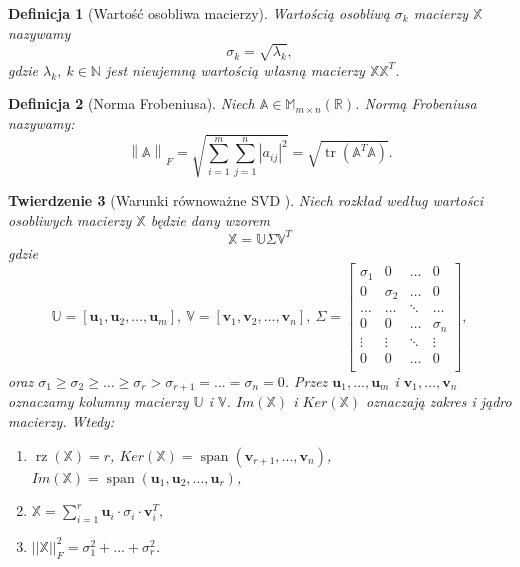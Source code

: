 \documentclass[12pt,a4paper]{report}
\newtheorem{df}{Definicja}[chapter]
\newtheorem{tw}[df]{Twierdzenie}
\newcommand{\setN}{\mathbb{N}}
\newcommand{\przestrzen}[1]{\operatorname{span}\left({#1} \right)}
\newcommand{\norm}[2][]{\left\| {#2} \right\|_{#1}}
\newcommand{\rz}[1]{\operatorname{rz}\left({#1} \right)}
\newcommand{\tr}[1]{\operatorname{tr}\left({#1} \right)}
\begin{document}
\begin{df}[Wartość osobliwa macierzy]
Wartością osobliwą $\sigma_k$ macierzy $\mathbb{X}$ nazywamy
$$
\sigma_k = \sqrt{\lambda_k},
$$
gdzie $\lambda_k, \: k \in \setN$ jest nieujemną wartością własną macierzy $\mathbb{X} \mathbb{X}^T$.
\end{df}

\begin{df}[Norma Frobeniusa{\citep{ulafiir}}] %
Niech $\mathbb{A}\in \mathbb{M}_{m\times n}(\mathbb{R})$. Normą Frobeniusa nazywamy:
$$
{\norm{\mathbb{A}}}_F = \sqrt{\sum_{i=1}^m \sum_{j=1}^n |a_{ij}|^2} = \sqrt{\tr{\mathbb{A}^T \mathbb{A}}}.
$$
\end{df}

\begin{tw}[Warunki równoważne SVD {\citep{ulafiir}}]%
Niech rozkład według wartości osobliwych macierzy $\mathbb{X}$ będzie dany wzorem
$$
\mathbb{X}=\mathbb{U} \Sigma \mathbb{V}^T
$$
gdzie 
$$\mathbb{U}=[\mathbf{u}_1,\mathbf{u}_2,...,\mathbf{u}_m], \: \mathbb{V} = [\mathbf{v}_1,\mathbf{v}_2,...,\mathbf{v}_n], \: \Sigma = \left[
        \begin{array}{cccc}
         \sigma_{1} & 0 & \ldots & 0 \\
         0 & \sigma_{2} & \ldots & 0 \\
         \ldots & \ldots& \ddots & \ldots \\
         0 & 0 & \ldots & \sigma_{n} \\
         \vdots & \vdots & \ddots & \vdots \\
         0 & 0 & \ldots & 0 \\
         \end{array}
      \right],$$
oraz 
$\sigma_{1}\geq \sigma_{2} \geq ... \geq \sigma_{r} > \sigma_{r+1} = ... = \sigma_{n} = 0$. Przez $\mathbf{u}_1, \ldots, \mathbf{u}_m$ i $\mathbf{v}_1, \ldots, \mathbf{v}_n$ oznaczamy kolumny macierzy $\mathbb{U}$ i $\mathbb{V}$.
$Im(\mathbb{X})$ i $Ker(\mathbb{X})$ oznaczają zakres i jądro macierzy.
Wtedy:
\begin{enumerate}
\item $\rz{\mathbb{X}} = r$, $Ker(\mathbb{X}) = \przestrzen{\mathbf{v}_{r+1},...,\mathbf{v}_n}$, 
$Im(\mathbb{X}) = \przestrzen{\mathbf{u}_1,\mathbf{u}_2,...,\mathbf{u}_r}$,
\item $\mathbb{X} = \sum_{i=1}^r \mathbf{u}_i \cdot\sigma_i \cdot \mathbf{v}_i^T,$
\item $||\mathbb{X}||_F^2 = \sigma_{1}^2+...+\sigma_{r}^2$.
\end{enumerate}
\end{tw}
\end{document}
